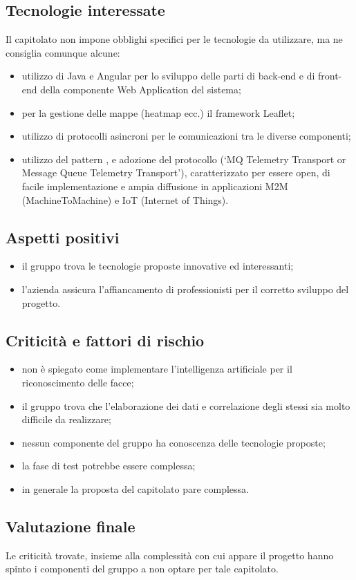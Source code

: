 \subsection{Tecnologie interessate}
Il capitolato non impone obblighi specifici per le tecnologie da utilizzare, ma ne consiglia comunque alcune:
\begin{itemize}
\item utilizzo di Java e Angular per lo sviluppo delle parti di back-end e di front-end della componente Web
Application del sistema;
\item per la gestione delle mappe (heatmap ecc.) il framework Leaflet;
\item utilizzo di protocolli asincroni per le comunicazioni tra le diverse componenti;
\item utilizzo del pattern , e adozione del protocollo  (‘MQ Telemetry Transport
or Message Queue Telemetry Transport’), caratterizzato per essere open, di facile implementazione
e ampia diffusione in applicazioni M2M (MachineToMachine) e IoT (Internet of Things).
\end{itemize}

\subsection{Aspetti positivi}
\begin{itemize}
\item il gruppo trova le tecnologie proposte innovative ed interessanti;
\item l'azienda assicura l'affiancamento di professionisti per il corretto sviluppo del progetto.
\end{itemize}

\subsection{Criticità e fattori di rischio}
\begin{itemize}
\item non è spiegato come implementare l'intelligenza artificiale per il riconoscimento delle facce;
\item il gruppo trova che l'elaborazione dei dati e correlazione degli stessi sia molto difficile da realizzare;
\item nessun componente del gruppo ha conoscenza delle tecnologie proposte;
\item la fase di test potrebbe essere complessa;
\item in generale la proposta del capitolato pare complessa.
\end{itemize}

\subsection{Valutazione finale}
Le criticità trovate, insieme alla complessità con cui appare il progetto hanno spinto i componenti del gruppo a non optare per tale capitolato.
